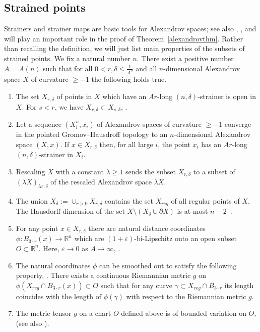 \documentclass[12pt,leqno,intlimits]{amsart}
\numberwithin{equation}{section}
\theoremstyle{definition}
\theoremstyle{remark}
\newcommand{\tref}[1]{Theorem~\ref{#1}}
\newcommand{\R}{\mathbb{R}}
\def\:{\colon}
\begin{document}
\subsection{Strained points} \label{subsec:strainer}
Strainers and strainer maps are basic tools for Alexandrov spaces; see also \cite{BGP}, \cite{Otsu-Shioya}, \cite{Shioya} and will play an important role in the proof of \tref{alexandrovthm}.
Rather than recalling the definition, we will just list main properties of the subsets of strained points. We fix a natural number $n$.
There exist a positive number $A=A(n)$ such that for all $0<r,\delta \leq \frac 1 {A^2}$ and all $n$-dimensional Alexandrov space $X$ of curvature $\geq -1$ the following holds true.
\begin{enumerate}

\item The set $X_{r,\delta}$ of points in $X$ which have an $Ar$-long $(n,\delta)$-strainer is open in $X$. For $s<r$, we have $X_{r,\delta} \subset X_{s,\delta}$, \cite[9.7]{BGP}.

\item Let a sequence $(X_i ^n,x_i)$ of Alexandrov spaces of curvature $\geq -1$ converge in the pointed Gromov--Hausdroff topology to an $n$-dimensional Alexandrov space $(X,x)$.
If $x\in X_{r,\delta}$ then, for all large $i$, the point $x_i$ has an $Ar$-long $(n, \delta)$-strainer in $X_i$.

\item Rescaling $X$ with a constant $\lambda \geq 1$ sends the subset $X_{r,\delta}$ to a subset of $(\lambda X )_{\lambda r, \delta} $ of the rescaled Alexandrov space $\lambda X$.

\item The union $X_{\delta}:= \cup _{r>0} X_{r,\delta}$ contains the set $X_{reg}$ of all regular points of $X$. The Hausdorff dimension of the set $X\setminus (X_{\delta} \cup \partial X)$ is at most $n-2$~\cite[10.6, 10.6.1, 12.8]{BGP}.

\item For any point $x\in X_{r,\delta}$ there are natural distance coordinates $\phi\: B_{3{\cdot}r} (x) \to \R^n$ which are $(1+\varepsilon)$-bi-Lipschitz onto an open subset $O \subset \R^n$. Here, $\varepsilon\to 0$ as $A\to\infty$, \cite[9.4]{BGP}.

\item The natural coordinates $\phi$ can be smoothed out to satisfy the following property, \cite[Theorem B]{Otsu-Shioya}. There exists a continuous Riemannian metric $g$ on $\phi (X_{reg} \cap B_{3{\cdot}r} (x)) \subset O$ such that for any curve $\gamma \subset X_{reg} \cap B_{3{\cdot}r} $ its length
coincides with the length of $\phi (\gamma )$ with respect to the Riemannian metric $g$.

\item The metric tensor $g$ on a chart $O$ defined above is of bounded variation on $O$, \cite[4.2]{Per-DC} (see also \cite{AB15}).
\end{enumerate}
\end{document}
